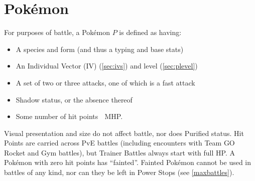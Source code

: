 \chapter{Pokémon}
\label{chap:pokemon}
For purposes of battle, a Pokémon $P$ is defined as having:
\begin{itemize}
\item A species and form (and thus a typing and base stats)
\item An Individual Vector (IV) (\autoref{sec:ivs}) and level (\autoref{sec:plevel})
\item A set of two or three attacks, one of which is a fast attack
\item Shadow status, or the absence thereof
\item Some number of hit points 󰥽 MHP.
\end{itemize}
Visual presentation and size do not affect battle, nor does Purified status.
Hit Points are carried across PvE battles (including encounters with
  Team GO Rocket and Gym battles), but Trainer Battles always start with full HP\@.
A Pokémon with zero hit points has ``fainted''.
Fainted Pokémon cannot be used in battles of any kind, nor can they be left in
 Power Stops (see \autoref{maxbattles}).


